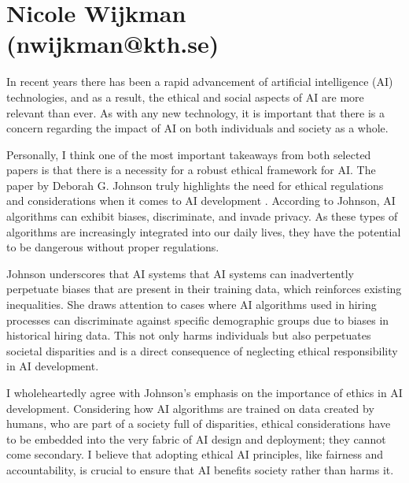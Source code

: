 \documentclass[12pt]{article}
\begin{document}
\section{Nicole Wijkman (nwijkman@kth.se)}
{
\setlength\parindent{0pt}   %
\setlength{\parskip}{\bigskipamount}    %




In recent years there has been a rapid advancement of artificial intelligence (AI) technologies, and as a result, the ethical and social aspects of AI are more relevant than ever. As with any new technology, it is important that there is a concern regarding the impact of AI on both individuals and society as a whole. 

Personally, I think one of the most important takeaways from both selected papers is that there is a necessity for a robust ethical framework for AI. The paper  by Deborah G. Johnson truly highlights the need for ethical regulations and considerations when it comes to AI development \cite{johnson1985technology}. According to Johnson, AI algorithms can exhibit biases, discriminate, and invade privacy. As these types of algorithms are increasingly integrated into our daily lives, they have the potential to be dangerous without proper regulations.

Johnson underscores that AI systems that AI systems can inadvertently perpetuate biases that are present in their training data, which reinforces existing inequalities. She draws attention to cases where AI algorithms used in hiring processes can discriminate against specific demographic groups due to biases in historical hiring data. This not only harms individuals but also perpetuates societal disparities and is a direct consequence of neglecting ethical responsibility in AI development.

I wholeheartedly agree with Johnson's emphasis on the importance of ethics in AI development. Considering how AI algorithms are trained on data created by humans, who are part of a society full of disparities, ethical considerations have to be embedded into the very fabric of AI design and deployment; they cannot come secondary. I believe that adopting ethical AI principles, like fairness and accountability, is crucial to ensure that AI benefits society rather than harms it. 

}
\end{document}
